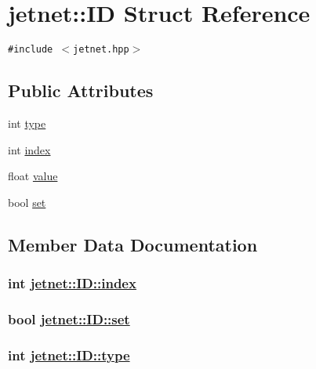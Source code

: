 \hypertarget{structjetnet_1_1ID}{
\section{jetnet::ID Struct Reference}
\label{structjetnet_1_1ID}
}
{\tt \#include $<$jetnet.hpp$>$}

\subsection*{Public Attributes}
\begin{CompactItemize}
\item 
int \hyperlink{structjetnet_1_1ID_o0}{type}
\item 
int \hyperlink{structjetnet_1_1ID_o1}{index}
\item 
float \hyperlink{structjetnet_1_1ID_o2}{value}
\item 
bool \hyperlink{structjetnet_1_1ID_o3}{set}
\end{CompactItemize}


\subsection{Member Data Documentation}
\hypertarget{structjetnet_1_1ID_o1}{
\subsubsection[index]{\setlength{\rightskip}{0pt plus 5cm}int \hyperlink{structjetnet_1_1ID_o1}{jetnet::ID::index}}}
\label{structjetnet_1_1ID_o1}


\hypertarget{structjetnet_1_1ID_o3}{
\subsubsection[set]{\setlength{\rightskip}{0pt plus 5cm}bool \hyperlink{structjetnet_1_1ID_o3}{jetnet::ID::set}}}
\label{structjetnet_1_1ID_o3}


\hypertarget{structjetnet_1_1ID_o0}{
\subsubsection[type]{\setlength{\rightskip}{0pt plus 5cm}int \hyperlink{structjetnet_1_1ID_o0}{jetnet::ID::type}}}
\label{structjetnet_1_1ID_o0}


